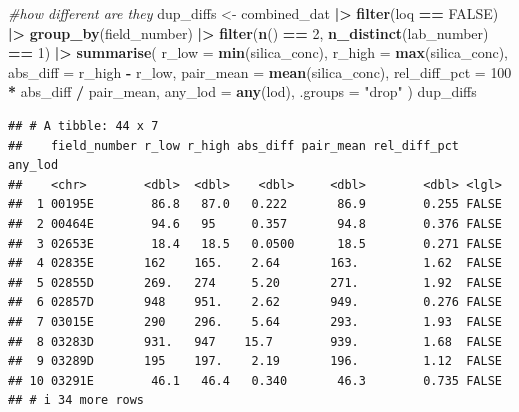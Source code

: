 \documentclass[
]{article}
\newenvironment{Shaded}{\begin{snugshade}}{\end{snugshade}}
\newcommand{\AttributeTok}[1]{\textcolor[rgb]{0.13,0.29,0.53}{#1}}
\newcommand{\CommentTok}[1]{\textcolor[rgb]{0.56,0.35,0.01}{\textit{#1}}}
\newcommand{\ConstantTok}[1]{\textcolor[rgb]{0.56,0.35,0.01}{#1}}
\newcommand{\DecValTok}[1]{\textcolor[rgb]{0.00,0.00,0.81}{#1}}
\newcommand{\FunctionTok}[1]{\textcolor[rgb]{0.13,0.29,0.53}{\textbf{#1}}}
\newcommand{\NormalTok}[1]{#1}
\newcommand{\OtherTok}[1]{\textcolor[rgb]{0.56,0.35,0.01}{#1}}
\newcommand{\SpecialCharTok}[1]{\textcolor[rgb]{0.81,0.36,0.00}{\textbf{#1}}}
\newcommand{\StringTok}[1]{\textcolor[rgb]{0.31,0.60,0.02}{#1}}
\begin{document}
\begin{Shaded}
\begin{Highlighting}[]
\CommentTok{\#how different are they }
\NormalTok{dup\_diffs }\OtherTok{\textless{}{-}}\NormalTok{ combined\_dat }\SpecialCharTok{|\textgreater{}} 
  \FunctionTok{filter}\NormalTok{(loq }\SpecialCharTok{==} \ConstantTok{FALSE}\NormalTok{) }\SpecialCharTok{|\textgreater{}} 
  \FunctionTok{group\_by}\NormalTok{(field\_number) }\SpecialCharTok{|\textgreater{}} 
  \FunctionTok{filter}\NormalTok{(}\FunctionTok{n}\NormalTok{() }\SpecialCharTok{==} \DecValTok{2}\NormalTok{,            }
         \FunctionTok{n\_distinct}\NormalTok{(lab\_number) }\SpecialCharTok{==} \DecValTok{1}\NormalTok{) }\SpecialCharTok{|\textgreater{}} 
  \FunctionTok{summarise}\NormalTok{(}
    \AttributeTok{r\_low        =} \FunctionTok{min}\NormalTok{(silica\_conc),}
    \AttributeTok{r\_high       =} \FunctionTok{max}\NormalTok{(silica\_conc),}
    \AttributeTok{abs\_diff     =}\NormalTok{ r\_high }\SpecialCharTok{{-}}\NormalTok{ r\_low,}
    \AttributeTok{pair\_mean    =} \FunctionTok{mean}\NormalTok{(silica\_conc),}
    \AttributeTok{rel\_diff\_pct =} \DecValTok{100} \SpecialCharTok{*}\NormalTok{ abs\_diff }\SpecialCharTok{/}\NormalTok{ pair\_mean,}
    \AttributeTok{any\_lod      =} \FunctionTok{any}\NormalTok{(lod),}
    \AttributeTok{.groups =} \StringTok{"drop"}
\NormalTok{  )}
\NormalTok{dup\_diffs}
\end{Highlighting}
\end{Shaded}

\begin{verbatim}
## # A tibble: 44 x 7
##    field_number r_low r_high abs_diff pair_mean rel_diff_pct any_lod
##    <chr>        <dbl>  <dbl>    <dbl>     <dbl>        <dbl> <lgl>  
##  1 00195E        86.8   87.0   0.222       86.9        0.255 FALSE  
##  2 00464E        94.6   95     0.357       94.8        0.376 FALSE  
##  3 02653E        18.4   18.5   0.0500      18.5        0.271 FALSE  
##  4 02835E       162    165.    2.64       163.         1.62  FALSE  
##  5 02855D       269.   274     5.20       271.         1.92  FALSE  
##  6 02857D       948    951.    2.62       949.         0.276 FALSE  
##  7 03015E       290    296.    5.64       293.         1.93  FALSE  
##  8 03283D       931.   947    15.7        939.         1.68  FALSE  
##  9 03289D       195    197.    2.19       196.         1.12  FALSE  
## 10 03291E        46.1   46.4   0.340       46.3        0.735 FALSE  
## # i 34 more rows
\end{verbatim}
\end{document}
